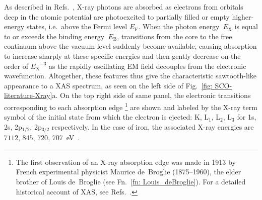 As described in Refs.~\cite{Rehr2000, deGroot2001, Glatzel2005, Chen2005, Chergui2009,
Bressler2010, Calvin2013},
X-ray photons are absorbed as electrons from orbitals deep in the atomic potential
are photoexcited to partially filled or empty higher-energy states,
i.e.~above the Fermi level $E_\text{F}$.
When the photon energy~$E_\text{X}$ is equal to or exceeds the binding energy~$E_\text{B}$,
transitions from the core to the free continuum above the vacuum level
suddenly become available,
causing absorption to increase sharply at these specific energies
and then gently decrease on the order of ${E_\text{X}}^{-3}$
as the rapidly oscillating EM field decouples from the electronic wavefunction.
%
Altogether, these features thus give the characteristic sawtooth-like appearance to
a XAS spectrum, as seen on the left side of Fig.~\ref{fig: SCO-literature-Xray}a.
On the top right side of same panel, the electronic transitions corresponding to
each absorption edge%
\footnote{The first observation of an X-ray absorption edge was made in 1913
by French experimental physicist Maurice de~Broglie (1875--1960),
the elder brother of Louis de~Broglie (see Fn.~\ref{fn: Louis_deBroglie}).
For a detailed historical account of XAS, see Refs.~\cite{Bordwehr1989, Lytle1999}.}
are shown and labeled by the X-ray term symbol of the initial state
from which the electron is ejected:
K, L$_1$, L$_2$, L$_3$ for 1s, 2s, 2p$_{1/2}$, 2p$_{3/2}$ respectively.
In the case of iron, the associated X-ray energies are
$7112$, $845$, $720$, $707$~eV~\cite{Henke1993}.
%
